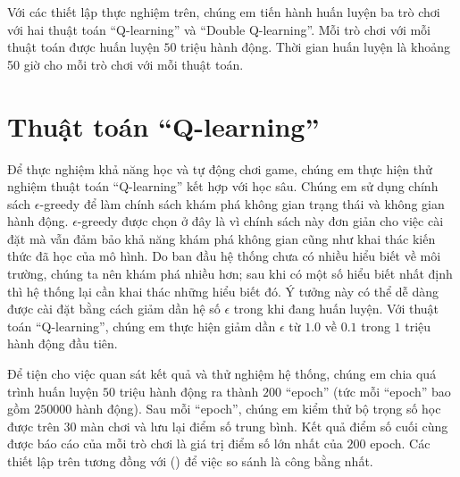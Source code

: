 	Với các thiết lập thực nghiệm trên, chúng em tiến hành huấn luyện ba trò chơi với hai thuật toán ``Q-learning'' và ``Double Q-learning''.
	Mỗi trò chơi với mỗi thuật toán được huấn luyện $50$ triệu hành động.
	Thời gian huấn luyện là khoảng 50 giờ cho mỗi trò chơi với mỗi thuật toán.
	
\section{Thuật toán ``Q-learning''}
	Để thực nghiệm khả năng học và tự động chơi game, chúng em thực hiện thử nghiệm thuật toán ``Q-learning'' kết hợp với học sâu.
	Chúng em sử dụng chính sách $\epsilon$-greedy để làm chính sách khám phá không gian trạng thái và không gian hành động.
	$\epsilon$-greedy được chọn ở đây là vì chính sách này đơn giản cho việc cài đặt mà vẫn đảm bảo khả năng khám phá không gian cũng như khai thác kiến thức đã học của mô hình.
	Do ban đầu hệ thống chưa có nhiều hiểu biết về môi trường, chúng ta nên khám phá nhiều hơn; sau khi có một số hiểu biết nhất định thì hệ thống lại cần khai thác những hiểu biết đó.
	Ý tưởng này có thể dễ dàng được cài đặt bằng cách giảm dần hệ số $\epsilon$ trong khi đang huấn luyện.
	Với thuật toán ``Q-learning'', chúng em thực hiện giảm dần $\epsilon$ từ $1.0$ về $0.1$ trong $1$ triệu hành động đầu tiên.
	
	Để tiện cho việc quan sát kết quả và thử nghiệm hệ thống, chúng em chia quá trình huấn luyện $50$ triệu hành động ra thành $200$ ``epoch'' (tức mỗi ``epoch'' bao gồm $250000$ hành động).
	Sau mỗi ``epoch'', chúng em kiểm thử bộ trọng số học được trên $30$ màn chơi và lưu lại điểm số trung bình.
	Kết quả điểm số cuối cùng được báo cáo của mỗi trò chơi là giá trị điểm số lớn nhất của $200$ epoch.
	Các thiết lập trên tương đồng với (\cite{mnihdqn2015}) để việc so sánh là công bằng nhất.
	
